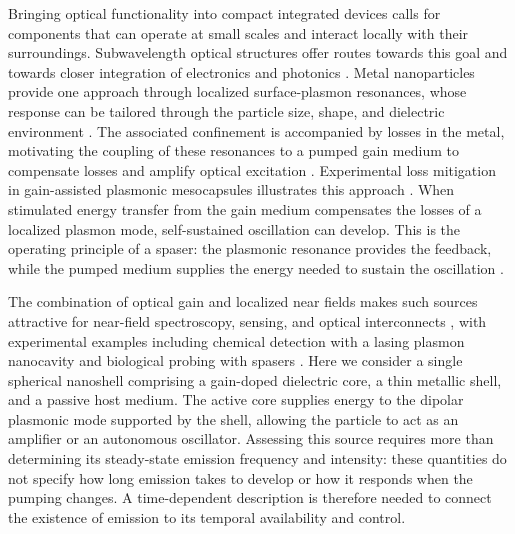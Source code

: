 \documentclass{optica-article}
\begin{document}
\begin{revision}
Bringing optical functionality into compact integrated devices calls for components that can operate at small scales and interact locally with their surroundings. Subwavelength optical structures offer routes towards this goal and towards closer integration of electronics and photonics \cite{Cheben:2018,Pshenichnyuk:2019}. Metal nanoparticles provide one approach through localized surface-plasmon resonances, whose response can be tailored through the particle size, shape, and dielectric environment \cite{Kelly:2003}. The associated confinement is accompanied by losses in the metal, motivating the coupling of these resonances to a pumped gain medium to compensate losses and amplify optical excitation \cite{Lawandy:2004,Gramotnev:2010,Veltri:2012,Caligiuri:2017,Azzam:2020,Caicedo:2025}. Experimental loss mitigation in gain-assisted plasmonic mesocapsules illustrates this approach \cite{Infusino:2014}. When stimulated energy transfer from the gain medium compensates the losses of a localized plasmon mode, self-sustained oscillation can develop. This is the operating principle of a spaser: the plasmonic resonance provides the feedback, while the pumped medium supplies the energy needed to sustain the oscillation \cite{stockman:2008,Passarelli:2016,Andrianov:2015}.

The combination of optical gain and localized near fields makes such sources attractive for near-field spectroscopy, sensing, and optical interconnects \cite{Ma:2019}, with experimental examples including chemical detection with a lasing plasmon nanocavity and biological probing with spasers \cite{Ma:2014Sensing,Galanzha:2017}. Here we consider a single spherical nanoshell comprising a gain-doped dielectric core, a thin metallic shell, and a passive host medium. The active core supplies energy to the dipolar plasmonic mode supported by the shell, allowing the particle to act as an amplifier or an autonomous oscillator. Assessing this source requires more than determining its steady-state emission frequency and intensity: these quantities do not specify how long emission takes to develop or how it responds when the pumping changes. A time-dependent description is therefore needed to connect the existence of emission to its temporal availability and control.


\end{revision}
\end{document}
